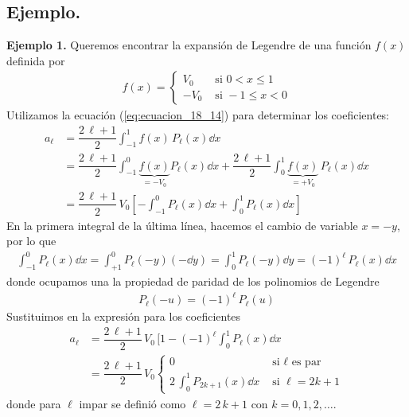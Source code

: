 \subsection{Ejemplo.}
\textbf{Ejemplo 1.} Queremos encontrar la expansión de Legendre de una función $f(x)$ definida por
\begin{align*}
f(x) = \begin{cases}
V_{0} & \mbox{ si } 0 < x \leq 1 \\[0.5em]
- V_{0} & \mbox{ si } -1 \leq x < 0
\end{cases}
\end{align*}
Utilizamos la ecuación (\ref{eq:ecuacion_18_14}) para determinar los coeficientes:
\begin{align*}
a_{\ell} &= \dfrac{2 \, \ell + 1}{2} \int_{-1}^{1} f(x) \, P_{\ell} (x) \dd{x} \\[0.5em]
&= \dfrac{2 \, \ell + 1}{2} \int_{-1}^{0} \underbrace{f(x)}_{=-V_0}  P_{\ell} (x) \dd{x} + \dfrac{2 \, \ell + 1}{2} \int_{0}^{1} \underbrace{f(x)}_{=+V_0} \, P_{\ell} (x) \dd{x} \\[0.5em]
&= \dfrac{2 \, \ell + 1}{2} \, V_{0} \left[ - \int_{-1}^{0} P_{\ell} (x) \dd{x} + \int_{0}^{1} P_{\ell} (x) \dd{x} \right]
\end{align*}
En la primera integral de la última línea, hacemos el cambio de variable $x = -y$, por lo que
\begin{align*}
\int_{-1}^{0} P_{\ell} (x) \dd{x} = \int_{+1}^{0} P_{\ell} (-y) (-\dd{y}) = \int_{0}^{1} P_{\ell} (-y) \dd{y} = (-1)^{\ell} \, P_{\ell} (x) \dd{x}
\end{align*}
donde ocupamos una la propiedad de paridad de los polinomios de Legendre
\begin{align*}
P_{\ell} (-u) = (-1)^{\ell} \, P_{\ell} (u)
\end{align*}
Sustituimos en la expresión para los coeficientes
\begin{align*}
a_{\ell} &= \dfrac{2 \, \ell + 1}{2} \, V_{0} \,  [1 - (-1)^{\ell} \int_{0}^{1} P_{\ell} (x) \dd{x} \\[0.5em]
&= \dfrac{2 \, \ell + 1}{2} \, V_{0} \begin{cases}
0 & \mbox{ si } \ell \mbox{ es par} \\[0.5em]
2 \, \displaystyle \int_{0}^{1} P_{2k+1} (x) \dd{x} & \mbox{ si } \ell = 2 k + 1 
\end{cases}
\end{align*}
donde para $\ell$ impar se definió como $\ell = 2 \, k + 1$ con $k = 0, 1, 2, \ldots$.
\par
